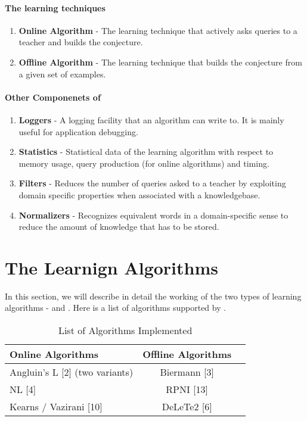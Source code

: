 \paragraph{The learning techniques}
\begin{enumerate}
 \item \textbf{Online Algorithm} - The learning technique that actively asks queries to a teacher and builds the conjecture.
 \item \textbf{Offline Algorithm} - The learning technique that builds the conjecture from a given set of examples.
\end{enumerate}

\paragraph{Other Componenets of \libalf}
\begin{enumerate}
 \item \textbf{Loggers} - A logging facility that an algorithm can write to. It is mainly useful for application debugging.
 \item \textbf{Statistics} - Statistical data of the learning algorithm with respect to memory usage, query production (for online algorithms) and timing.
 \item \textbf{Filters} - Reduces the number of queries asked to a teacher by exploiting domain specific properties when associated with a knowledgebase.
 \item \textbf{Normalizers} - Recognizes equivalent words in a domain-specific sense to reduce the amount of knowledge that has to be stored.
\end{enumerate}


\section{The Learnign Algorithms}
In this section, we will describe in detail the working of the two types of learning algorithms - \online and \offline. Here is a list of algorithms supported by \libalf.

\begin{table} [h]
\centering
\begin{tabular}[c]{lcr}
\toprule[1pt]
Online Algorithms & Offline Algorithms \\	
\midrule
Angluin's L [2] (two variants) & Biermann [3] \\
NL [4] & RPNI [13] \\
Kearns / Vazirani [10] & DeLeTe2 [6]\\
\bottomrule[1pt]
\end{tabular}
\caption{List of Algorithms Implemented}
\label{algtables1}
\end{table}

